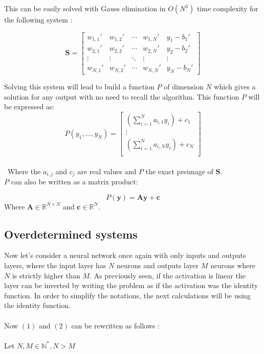 \documentclass{article}
\begin{document}
    This can be easily solved with Gauss elimination in $O(N^3)$ time complexity for the following system :

    \begin{equation*}
        \textbf{S}= \left[\begin{array}{cccc|c}  
        w_{1,1}'& w_{1,2}' & \cdots & w_{1,N}' & y_{1}-b_{1}' \\
        w_{2,1}' & w_{2,2}' & \cdots & w_{2,N}' & y_{2}-b_{2}'\\
        \vdots  & \vdots  & \ddots & \vdots & \vdots\\
        w_{N,1}' & w_{N,2}' & \cdots & w_{N,N}' & y_{N}-b_{N}'
       \end{array}\right]
    \end{equation*}

    Solving this system will lead to build a function $P$ of dimension $N$ which gives a solution for any output with no need to recall the algorithm. This function
    $P$ will be expressed as:
    \begin{equation*}
        P(y_{1},...,y_{N}) = 
        \begin{bmatrix}
            (\sum_{i=1}^{N} a_{i,1}y_{i}) + c_{1}\\
            \vdots \\
            (\sum_{i=1}^{N} a_{i,N}y_{i}) + c_{N}\\
        \end{bmatrix}
    \end{equation*}
    \\\
    Where the $a_{i,j}$ and $c_{j}$ are real values and $P$ the exact preimage of $\textbf{S}$.\\
    $P$ can also be written as a matrix product:

    \begin{equation*}
        P(\textbf{y}) = \textbf{Ay} + \textbf{c}
    \end{equation*}
Where $\textbf{A} \in  \mathbb{R}^{N \times N}$ and $\textbf{c} \in \mathbb{R}^{N}.$

\subsection{Overdetermined systems}

Now let’s consider a neural network once again with only inputs and outputs layers, 
where the input layer has $N$ neurons and outputs layer $M$ neurons where $N$ is strictly higher than $M$.
As previously seen, if the activation is linear the layer can be inverted by writing the problem as if the activation was the identity function.
In order to simplify the notations, the next calculations will be using the identity function.
\\\\
Now $(1)$ and $(2)$ can be rewritten as follows : 
\\
\\
Let $ N,M \in \mathbb{N^{*}},N>M$
\end{document}
